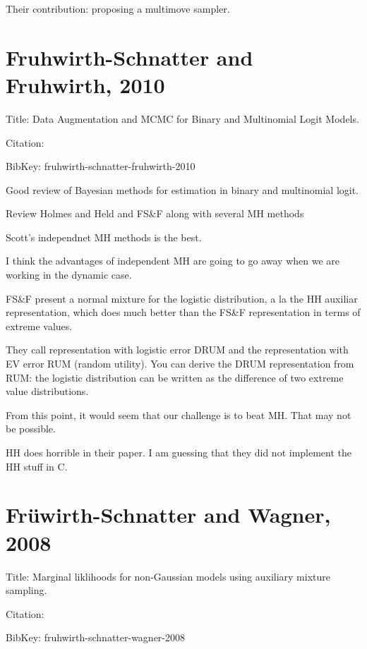 \documentclass{article}
\begin{document}
Their contribution: proposing a multimove sampler.

\section{Fruhwirth-Schnatter and Fruhwirth, 2010}

Title: Data Augmentation and MCMC for Binary and Multinomial Logit Models. 

Citation: \cite{fruhwirth-schnatter-fruhwirth-2010}

BibKey: fruhwirth-schnatter-fruhwirth-2010

Good review of Bayesian methods for estimation in binary and multinomial logit.

\begin{outline}

\1 Review Holmes and Held and FS\&F along with several MH methods

\1 Scott's independnet MH methods is the best.

\2 I think the advantages of independent MH are going to go away when we are
working in the dynamic case.

\1 FS\&F present a normal mixture for the logistic distribution, a la the HH
auxiliar representation, which does much better than the FS\&F representation in
terms of extreme values.

\2 They call representation with logistic error DRUM and the representation with
EV error RUM (random utility).  You can derive the DRUM representation from RUM:
the logistic distribution can be written as the difference of two extreme value
distributions.

\1 From this point, it would seem that our challenge is to beat MH.  That may
not be possible.

\1 HH does horrible in their paper.  I am guessing that they did not implement the
HH stuff in C.

\end{outline}

\section{Fr\"{u}wirth-Schnatter and Wagner, 2008}

Title: Marginal liklihoods for non-Gaussian models using auxiliary mixture
sampling.

Citation: \cite{fruhwirth-schnatter-wagner-2008}

BibKey: fruhwirth-schnatter-wagner-2008
\end{document}
